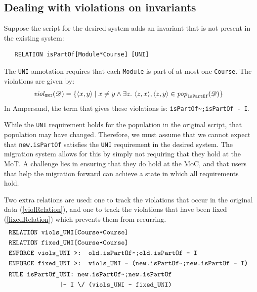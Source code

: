 \documentclass[runningheads]{llncs}
\newcommand{\id}[1]{\text{\it #1\/}}
\newcommand{\popF}[1]{\id{pop}_{#1}}
\newcommand{\pop}[2]{\popF{#1}(#2)}
\newcommand{\viol}[2]{\violC{#1}(#2)}
\newcommand{\violC}[1]{\id{viol}_{#1}}
\newcommand{\pair}[2]{\langle{#1},{#2}\rangle}
\newcommand{\dataset}{\mathscr{D}}
\begin{document}
\subsection{Dealing with violations on invariants}\label{sec:violations on invariants}
   Suppose the script for the desired system adds an invariant that is not present in the existing system:
   
\begin{verbatim}
   RELATION isPartOf[Module*Course] [UNI]
\end{verbatim}
   
   The \verb=UNI= annotation requires that each \verb=Module= is part of at most one \verb=Course=.
   The violations are given by:
\begin{eqnarray}
   \viol{\tt UNI}{\dataset} = \{\pair{x}{y} \mid x \neq y \wedge \exists z.~ \pair{z}{x}, \pair{z}{y}\in\pop{\tt isPartOf}{\dataset} \}
\end{eqnarray}
   In Ampersand, the term that gives these violations is: \verb=isPartOf~;isPartOf - I=.
   
   While the \verb=UNI= requirement holds for the population in the original script, that population may have changed.
   Therefore, we must assume that we cannot expect that \verb=new.isPartOf= satisfies the \verb=UNI= requirement in the desired system.
   The migration system allows for this by simply not requiring that they hold at the MoT.
   A challenge lies in ensuring that they do hold at the MoC, and that users that help the migration forward can achieve a state in which all requirements hold.
   
   Two extra relations are used: one to track the violations that occur in the original data (\ref{violRelation}), and one to track the violations that have been fixed (\ref{fixedRelation}) which prevents them from recurring.
\begin{align}
   &\text{\tt RELATION viols\_UNI[Course*Course]}\label{violRelation}\\
   &\text{\tt RELATION fixed\_UNI[Course*Course]}\label{fixedRelation}\\
   &\text{\tt ENFORCE viols\_UNI >: old.isPartOf\textasciitilde;old.isPartOf - I}\label{fill viols}\\
   &\text{\tt ENFORCE fixed\_UNI >: viols\_UNI - (new.isPartOf\textasciitilde;new.isPartOf - I)}\label{fill fixed}\\
   &\begin{aligned}
   \text{\tt RULE isPartOf\_UNI: new.isPartOf\textasciitilde;new.isPartOf}\\
   \quad\text{\tt |- I \textbackslash/ (viols\_UNI - fixed\_UNI)}
   \end{aligned}\label{rule uni}
\end{align}
   
\end{document}
